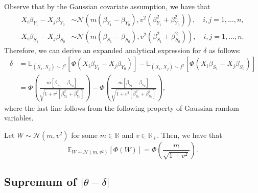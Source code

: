 \documentclass[referee,usenatbib]{biom}
\newcommand{\E}{\mathbb{E}}
\newcommand{\R}{\mathbb{R}}
\begin{document}
Observe that by the Gaussian covariate assumption, we have that
\begin{align*}
    X_{i} \beta_{Y_{1}} - X_{j} \beta_{Y_{0}} & \sim \mathcal{N} \left( m (\beta_{Y_{1}} - \beta_{Y_{0}}), v^2 (\beta_{Y_{1}}^2 + \beta_{Y_{0}}^2) \right), \quad i,j = 1, \ldots, n, \\
    X_{i} \beta_{S_{1}} - X_{j} \beta_{S_{0}} & \sim \mathcal{N} \left( m (\beta_{S_{1}} - \beta_{S_{0}}), v^2 (\beta_{S_{1}}^2 + \beta_{S_{0}}^2) \right), \quad i,j = 1, \ldots, n.
\end{align*}
Therefore, we can derive an expanded analytical expression for \(\delta\) as follows:
\begin{align*}
    \delta & = \E_{(X_{i}, X_{j}) \sim f^{2}} \!\left[ \Phi \left( X_{i} \beta_{Y_{1}} - X_{j} \beta_{Y_{0}} \right) \right] - \E_{(X_{i}, X_{j}) \sim f^{2}} \!\left[ \Phi \left( X_{i} \beta_{S_{1}} - X_{j} \beta_{S_{0}} \right) \right] \\
    & = \Phi \left( \frac{m [\beta_{Y_{1}} - \beta_{Y_{0}}]}{\sqrt{1 + v^2 [\beta_{Y_{1}}^2 + \beta_{Y_{0}}^2]}} \right) - \Phi \left( \frac{m [\beta_{S_{1}} - \beta_{S_{0}}]}{\sqrt{1 + v^2 [\beta_{S_{1}}^2 + \beta_{S_{0}}^2]}} \right),
\end{align*}
where the last line follows from the following property of Gaussian random variables.

\begin{lemma}
\label{lemma:gaussian_phi_identity}
    Let \(W \sim \mathcal{N}(m, v^2)\) for some \(m \in \mathbb{R}\) and \(v \in \R_{+}\). Then, we have that
    \begin{equation*}
        \E_{W \sim \mathcal{N}(m, v^2)} \!\left[ \Phi(W) \right] = \Phi \!\left( \frac{m}{\sqrt{1 + v^2}} \right).
    \end{equation*}
\end{lemma}

\subsection{Supremum of \texorpdfstring{\(|\theta - \delta|\)}{|theta - delta|}}
\label{app:supremum_delta_gaussian_covariate}
\end{document}
